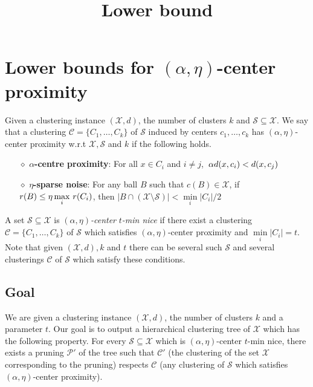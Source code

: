 \documentclass[11pt]{article}
\title{\LARGE Lower bound}
\author{}
\newcommand{\mc}{\mathcal}
\begin{document}
\maketitle

\section{Lower bounds for $(\alpha, \eta)$-center proximity}

\begin{definition}
Given a clustering instance $(\mc X, d)$, the number of clusters $k$ and $\mc S \subseteq \mc X$. We say that a clustering $\mc C = \{C_1, \ldots, C_k\}$ of $\mc S$ induced by centers $c_1, \ldots, c_k$ has $(\alpha, \eta)$-center proximity w.r.t $\mc X, \mc S$ and $k$ if the following holds.

\begin{itemize}[nolistsep, noitemsep]
\label{defn:alphacpnoise}	

\item[$\diamond$] {\bf $\alpha$-centre proximity}: For all $x \in C_i$ and $i\neq j$, $\thinspace\alpha d(x, c_i) < d(x, c_j)$
\item[$\diamond$]{\bf $\eta$-sparse noise}: For any ball $B$ such that $c(B)\in \mathcal{X}$, if $r(B)\leq \eta\max\limits_{i} \thinspace r(C_i)$, then $|B\cap (\mc X\setminus \mc S)| < \min\limits_{i} |C_i|/2$
\end{itemize}
\end{definition}

\noindent A set $\mc S \subseteq \mc X$ is {\it $(\alpha, \eta)$-center} {\it $t$-min nice} if there exist a clustering $\mc C=\{C_1,\ldots,C_k\}$ of $\mc S$ which satisfies $(\alpha, \eta)$-center proximity and $\min\limits_{i} \lvert C_i\rvert = t$. Note that given $(\mc X, d), k$ and $t$ there can be several such $\mc S$ and several clusterings $\mc C$ of $\mc S$ which satisfy these conditions.

\subsection{Goal}
We are given a clustering instance $(\mc X, d)$, the number of clusters $k$ and a parameter $t$. Our goal is to output a hierarchical clustering tree of $\mc X$ which has the following property. For every $\mc S \subseteq \mc X$ which is $(\alpha, \eta)$-center $t$-min nice, there exists a pruning $\mc P'$ of the tree such that $\mc C'$ (the clustering of the set $\mc X$ corresponding to the pruning) respects $\mc C$ (any clustering of $\mc S$ which satisfies $(\alpha, \eta)$-center proximity). 
\end{document}
